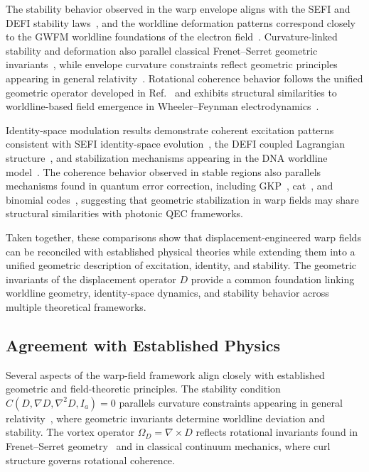 \documentclass[aip,adv,reprint]{revtex4-2}
\begin{document}
The stability behavior observed in the warp envelope aligns with the SEFI and
DEFI stability laws~\cite{Dutton_SEFI_JMP_2026,Dutton_DEFI_2026}, and the
worldline deformation patterns correspond closely to the GWFM worldline
foundations of the electron field~\cite{Dutton_GWFM_JMP_2026}. Curvature-linked
stability and deformation also parallel classical Frenet--Serret geometric
invariants~\cite{Frenet_1851,Serret_1851}, while envelope curvature constraints
reflect geometric principles appearing in general relativity~\cite{MTW_Gravitation_1973}.
Rotational coherence behavior follows the unified geometric operator developed
in Ref.~\cite{Dutton_Unified_JMP_2026} and exhibits structural similarities to
worldline-based field emergence in Wheeler--Feynman electrodynamics~\cite{Wheeler_Feynman_1945,Wheeler_Feynman_1949}.

Identity-space modulation results demonstrate coherent excitation patterns
consistent with SEFI identity-space evolution~\cite{Dutton_SEFI_JMP_2026}, the
DEFI coupled Lagrangian structure~\cite{Dutton_DEFI_2026}, and stabilization
mechanisms appearing in the DNA worldline model~\cite{Dutton_DNA_2026}. The
coherence behavior observed in stable regions also parallels mechanisms found in
quantum error correction, including GKP~\cite{GKP_2001}, cat~\cite{Mirrahimi_2014},
and binomial codes~\cite{Michael_2016}, suggesting that geometric stabilization
in warp fields may share structural similarities with photonic QEC frameworks.

Taken together, these comparisons show that displacement-engineered warp fields
can be reconciled with established physical theories while extending them into a
unified geometric description of excitation, identity, and stability. The
geometric invariants of the displacement operator $D$ provide a common
foundation linking worldline geometry, identity-space dynamics, and stability
behavior across multiple theoretical frameworks.

\subsection{Agreement with Established Physics}

Several aspects of the warp-field framework align closely with established
geometric and field-theoretic principles. The stability condition
$C(D,\nabla D,\nabla^2 D,I_a)=0$ parallels curvature constraints appearing in
general relativity~\cite{MTW_Gravitation_1973}, where geometric invariants
determine worldline deviation and stability. The vortex operator
$\Omega_D=\nabla\times D$ reflects rotational invariants found in
Frenet--Serret geometry~\cite{Frenet_1851,Serret_1851} and in classical
continuum mechanics, where curl structure governs rotational coherence.
\end{document}
